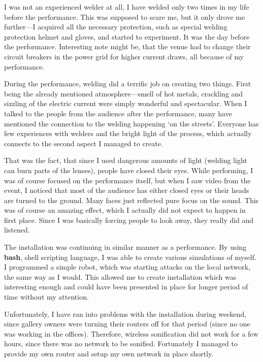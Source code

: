 \documentclass[12pt,a4paper,oneside]{report}
\begin{document}
I was not an experienced welder at all, I have welded only two times in my life before the performance. This was supposed to scare me, but it only drove me further---I acquired all the necessary protection, such as special welding protection helmet and gloves, and started to experiment. It was the day before the performance. Interesting note might be, that the venue had to change their circuit breakers in the power grid for higher current draws, all because of my performance.

During the performance, welding did a terrific job on creating two things. First being the already mentioned atmosphere---smell of hot metals, crackling and sizzling of the electric current were simply wonderful and spectacular. When I talked to the people from the audience after the performance, many have mentioned the connection to the welding happening `on the streets'. Everyone has few experiences with welders and the bright light of the process, which actually connects to the second aspect I managed to create. 

That was the fact, that since I used dangerous amounts of light (welding light can burn parts of the lenses), people have closed their eyes. While performing, I was of course focused on the performance itself, but when I saw video from the event, I noticed that most of the audience has either closed eyes or their heads are turned to the ground. Many faces just reflected pure focus on the sound. This was of course an amazing effect, which I actually did not expect to happen in first place. Since I was basically forcing people to look away, they really did and listened.

The installation was continuing in similar manner as a performance. By using \textbf{bash}, shell scripting language, I was able to create various simulations of myself. I programmed a simple robot, which was starting attacks on the local network, the same way as I would. This allowed me to create installation which was interesting enough and could have been presented in place for longer period of time without my attention.

Unfortunately, I have ran into problems with the installation during weekend, since gallery owners were turning their routers off for that period (since no one was working in the offices). Therefore, wireless sonification did not work for a few hours, since there was no network to be sonified. Fortunately I managed to provide my own router and setup my own network in place shortly.
\end{document}
